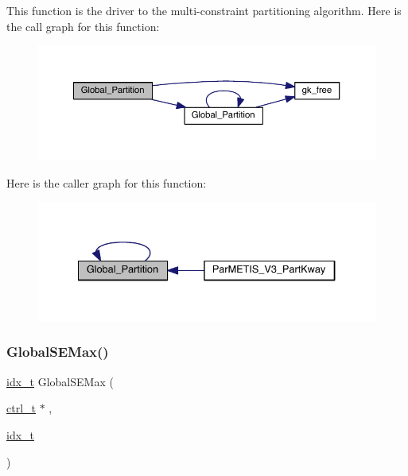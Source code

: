 This function is the driver to the multi-\/constraint partitioning algorithm. Here is the call graph for this function\+:\nopagebreak
\begin{figure}[H]
\begin{center}
\leavevmode
\includegraphics[width=350pt]{a00951_a979ec26537f665b3e2b098595fde106c_cgraph}
\end{center}
\end{figure}
Here is the caller graph for this function\+:\nopagebreak
\begin{figure}[H]
\begin{center}
\leavevmode
\includegraphics[width=334pt]{a00951_a979ec26537f665b3e2b098595fde106c_icgraph}
\end{center}
\end{figure}
\mbox{\label{a00951_afb6bea7b43d9d070cf5e7118a02a3061}} 
\subsubsection{\texorpdfstring{Global\+S\+E\+Max()}{GlobalSEMax()}}
{\footnotesize\ttfamily \hyperlink{a00876_aaa5262be3e700770163401acb0150f52}{idx\+\_\+t} Global\+S\+E\+Max (\begin{DoxyParamCaption}\item[{\hyperlink{a00742}{ctrl\+\_\+t} $\ast$}]{,  }\item[{\hyperlink{a00876_aaa5262be3e700770163401acb0150f52}{idx\+\_\+t}}]{ }\end{DoxyParamCaption})}

